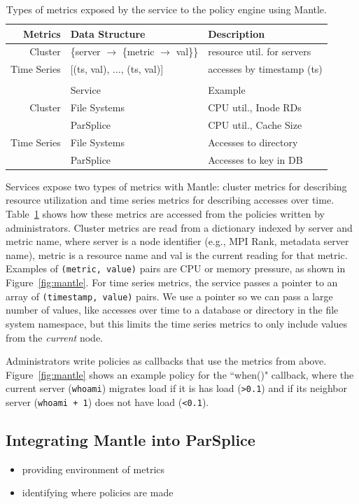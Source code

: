 \begin{table}
  \centering
  \begin{tabular}{ r | l | l }
  Metrics     & Data Structure & Description \\\hline
  Cluster     & \{server \(\rightarrow\) \{metric \(\rightarrow\) val\}\}
              & resource util. for servers \\
  Time Series & [(ts, val), ..., (ts, val)]
              & accesses by timestamp (ts) \\
  && \\
              & Service      & Example \\\hline
  Cluster     & File Systems & CPU util., Inode RDs \\
              & ParSplice    & CPU util., Cache Size \\
  Time Series & File Systems & Accesses to directory \\
              & ParSplice    & Accesses to key in DB\\
  \end{tabular}
  \caption{Types of metrics exposed by the service to the policy engine using Mantle.\label{table:metrics}}
\end{table}

Services expose two types of metrics with Mantle: cluster metrics for
describing resource utilization and time series metrics for describing accesses
over time. Table~\ref{table:metrics} shows how these metrics are accessed from
the policies written by administrators. Cluster metrics are read from a
dictionary indexed by server and metric name, where server is a node identifier
({e.g.}, MPI Rank, metadata server name), metric is a resource name and val is
the current reading for that metric.  Examples of \texttt{(metric, value)}
pairs are CPU or memory pressure, as shown in Figure~\ref{fig:mantle}.  For
time series metrics, the service passes a pointer to an array of
\texttt{(timestamp, value)} pairs. We use a pointer so we can pass a large
number of values, like accesses over time to a database or directory in the
file system namespace, but this limits the time series metrics to only include
values from the {\it current } node.

Administrators write policies as callbacks that use the metrics from above.
Figure~\ref{fig:mantle} shows an example policy for the ``when()" callback, where the
current server (\texttt{whoami}) migrates load if it is has load
(\texttt{>0.1}) and if its neighbor server (\texttt{whoami + 1}) does not have
load (\texttt{<0.1}). 

\subsection{Integrating Mantle into ParSplice}

\begin{itemize}
  \item providing environment of metrics
  \item identifying where policies are made
\end{itemize}
